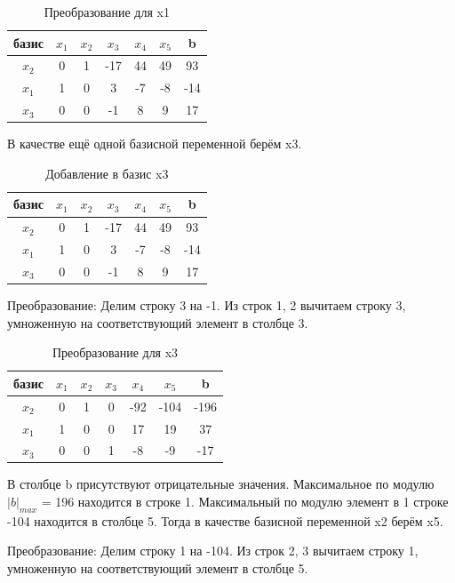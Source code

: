 \documentclass{article}
\begin{document}
\begin{table}[H]
    \centering
    \caption{Преобразование для x1}
    \begin{tabular}{|c|c|c|c|c|c|c|}
    \hline
        базис & $x_1$ & $x_2$ & $x_3$ & $x_4$ & $x_5$ & b \\ \hline
        $x_2$ & 0	&1&	-17	&44&	49&	93 \\
        $x_1$ & 1&	0&	3	&-7	&-8	&-14 \\
        $x_3$  & 0	&0	&-1&	8	&9	&17 \\ \hline
    \end{tabular}
\end{table}

В качестве ещё одной базисной переменной берём x3.
\begin{table}[H]
    \centering
    \caption{Добавление в базис x3}
    \begin{tabular}{|c|c|c|c|c|c|c|}
    \hline
        базис & $x_1$ & $x_2$ & $x_3$ & $x_4$ & $x_5$ & b \\ \hline
        $x_2$ & 0	&1&	-17	&44&	49&	93 \\
        $x_1$ & 1&	0&	3	&-7	&-8	&-14 \\
        $x_3$  & 0	&0	&-1&	8	&9	&17 \\ \hline
    \end{tabular}
\end{table}

Преобразование: Делим строку 3 на -1. Из строк 1, 2 вычитаем строку 3, умноженную на соответствующий элемент в столбце 3.

\begin{table}[H]
    \centering
    \caption{Преобразование для x3}
    \begin{tabular}{|c|c|c|c|c|c|c|}
    \hline
        базис & $x_1$ & $x_2$ & $x_3$ & $x_4$ & $x_5$ & b \\ \hline
        $x_2$ & 0	&1&	0	&-92&	-104	&-196 \\
        $x_1$ & 1	&0&	0	&17	&19&	37 \\
        $x_3$  & 0&0	&1	&-8	&-9	&-17 \\ \hline
    \end{tabular}
\end{table}

В столбце b присутствуют отрицательные значения. Максимальное по модулю $|b|_{max}$ = 196 находится в строке 1. 
Максимальный по модулю элемент в 1 строке -104 находится в столбце 5. 
Тогда в качестве базисной переменной x2 берём x5.

Преобразование: Делим строку 1 на -104. Из строк 2, 3 вычитаем строку 1, умноженную на соответствующий элемент в столбце 5.
\end{document}
